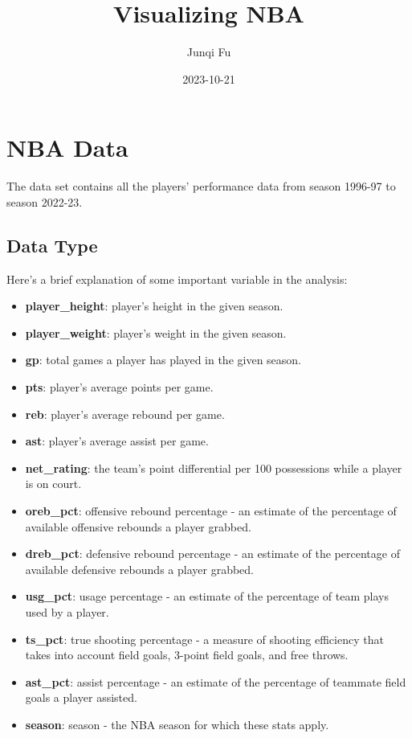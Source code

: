 \documentclass[
]{book}
\title{Visualizing NBA}
\author{Junqi Fu}
\date{2023-10-21}
\providecommand{\tightlist}{%
  \setlength{\itemsep}{0pt}\setlength{\parskip}{0pt}}
\theoremstyle{definition}
\theoremstyle{definition}
\theoremstyle{definition}
\theoremstyle{definition}
\theoremstyle{remark}
\begin{document}
\maketitle

{
\setcounter{tocdepth}{1}
\tableofcontents
}
\hypertarget{nba-data}{%
\chapter{NBA Data}\label{nba-data}}

The data set contains all the players' performance data from season 1996-97 to season 2022-23.

\hypertarget{data-type}{%
\section{Data Type}\label{data-type}}

Here's a brief explanation of some important variable in the analysis:

\begin{itemize}
\tightlist
\item
  \textbf{player\_height}: player's height in the given season.
\item
  \textbf{player\_weight}: player's weight in the given season.
\item
  \textbf{gp}: total games a player has played in the given season.
\item
  \textbf{pts}: player's average points per game.
\item
  \textbf{reb}: player's average rebound per game.
\item
  \textbf{ast}: player's average assist per game.
\item
  \textbf{net\_rating}: the team's point differential per 100 possessions while a player is on court.
\item
  \textbf{oreb\_pct}: offensive rebound percentage - an estimate of the percentage of available offensive rebounds a player grabbed.
\item
  \textbf{dreb\_pct}: defensive rebound percentage - an estimate of the percentage of available defensive rebounds a player grabbed.
\item
  \textbf{usg\_pct}: usage percentage - an estimate of the percentage of team plays used by a player.
\item
  \textbf{ts\_pct}: true shooting percentage - a measure of shooting efficiency that takes into account field goals, 3-point field goals, and free throws.
\item
  \textbf{ast\_pct}: assist percentage - an estimate of the percentage of teammate field goals a player assisted.
\item
  \textbf{season}: season - the NBA season for which these stats apply.
\end{itemize}
\end{document}
